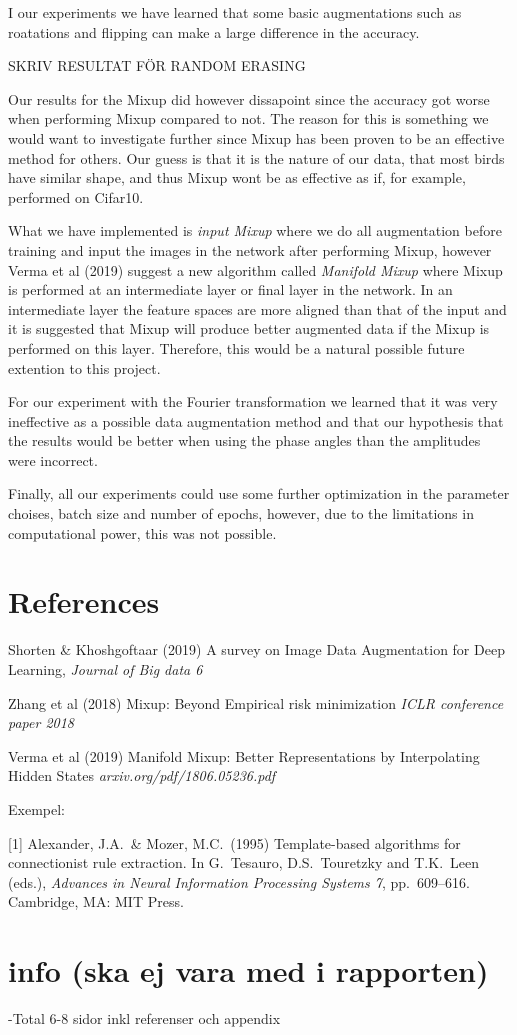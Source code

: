 \documentclass{article}
\begin{document}
I our experiments we have learned that some basic augmentations such as roatations and flipping can make a large difference in the accuracy. 

SKRIV RESULTAT FÖR RANDOM ERASING

Our results for the Mixup did however dissapoint since the accuracy got worse when performing Mixup compared to not. 
The reason for this is something we would want to investigate further since Mixup has been proven to be an effective method for others.
Our guess is that it is the nature of our data, that most birds have similar shape, and thus Mixup wont be as effective as if, for example, performed on Cifar10.

What we have implemented is \textit{input Mixup} where we do all augmentation before training and input the images in the network after performing Mixup, however Verma et al (2019) 
suggest a new algorithm called \textit{Manifold Mixup} where Mixup is performed at an intermediate layer or final layer in the network. In an intermediate layer 
the feature spaces are more aligned than that of the input and it is suggested that Mixup will produce better augmented data if the Mixup is performed on this layer. Therefore, this would be 
a natural possible future extention to this project. 

For our experiment with the Fourier transformation we learned that it was very ineffective as a possible data augmentation method and that our hypothesis 
that the results would be better when using the phase angles than the amplitudes were incorrect. 

Finally, all our experiments could use some further optimization in the parameter choises, batch size and number of epochs, however, due to the limitations 
in computational power, this was not possible. 

\section*{References}

Shorten \& Khoshgoftaar (2019) A survey on Image Data Augmentation for Deep Learning, \textit{Journal of Big data 6}

Zhang et al (2018) Mixup: Beyond Empirical risk minimization \textit{ICLR conference paper 2018}

Verma et al (2019) Manifold Mixup: Better Representations by Interpolating Hidden States \textit{arxiv.org/pdf/1806.05236.pdf}

Exempel:
\medskip

\small

[1] Alexander, J.A.\ \& Mozer, M.C.\ (1995) Template-based algorithms for
connectionist rule extraction. In G.\ Tesauro, D.S.\ Touretzky and T.K.\ Leen
(eds.), {\it Advances in Neural Information Processing Systems 7},
pp.\ 609--616. Cambridge, MA: MIT Press.

\section{info (ska ej vara med i rapporten)}

-Total 6-8 sidor inkl referenser och appendix
\end{document}
